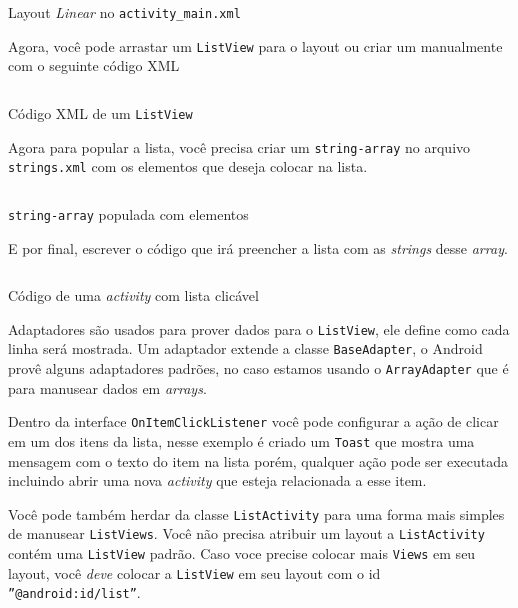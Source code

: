 \documentclass[a4paper,12pt,brazil,doubleside]{book}
\begin{document}
\begin{singlespace}
\begin{listing}[H]
\inputminted[linenos=true,fontsize=\small,frame=lines, framesep=2mm, tabsize=2,numbersep=5pt]{xml}{src/design/layout_linear.xml}
\caption{Layout \textit{Linear} no \texttt{activity\_main.xml}}
\end{listing}

Agora, você pode arrastar um \texttt{ListView} para o layout ou criar um manualmente com o seguinte código XML

\begin{listing}[H]
\inputminted[linenos=true,fontsize=\small,frame=lines, framesep=2mm, tabsize=2,numbersep=5pt]{xml}{src/design/listview.xml}
\caption{Código XML de um \texttt{ListView}}
\end{listing}

Agora para popular a lista, você precisa criar um \texttt{string-array} no arquivo \texttt{\textcolor{mygreen}{strings.xml}} com os elementos que deseja colocar na lista.

\begin{listing}[H]
\inputminted[linenos=true,fontsize=\small,frame=lines, framesep=2mm, tabsize=2,numbersep=5pt]{xml}{src/design/string-array.xml}
\caption{\texttt{string-array} populada com elementos}
\end{listing}

E por final, escrever o código que irá preencher a lista com as \textit{strings} desse \textit{array}.

\begin{listing}[H]
\inputminted[linenos=true,fontsize=\small,frame=lines, framesep=2mm, tabsize=2,numbersep=5pt]{java}{src/design/listactivity.java}
\caption{Código de uma \emph{activity} com lista clicável}
\end{listing}

Adaptadores são usados para prover dados para o \texttt{ListView}, ele define como cada linha será mostrada. Um adaptador extende a classe \texttt{BaseAdapter}, o Android provê alguns adaptadores padrões, no caso estamos usando o \texttt{ArrayAdapter} que é para manusear dados em \textit{arrays}.

Dentro da interface \texttt{OnItemClickListener} você pode configurar a ação de clicar em um dos itens da lista, nesse exemplo é criado um \texttt{Toast} que mostra uma mensagem com o texto do item na lista porém, qualquer ação pode ser executada incluindo abrir uma nova \emph{activity} que esteja relacionada a esse item.

Você pode também herdar da classe \texttt{ListActivity} para uma forma mais simples de manusear \texttt{ListViews}. Você não precisa atribuir um layout a \texttt{ListActivity} contém uma \texttt{ListView} padrão. Caso voce precise colocar mais \texttt{Views} em seu layout, você \emph{deve} colocar a \texttt{ListView} em seu layout com o id \texttt{''@android:id/list''}.


\end{singlespace}
\end{document}
